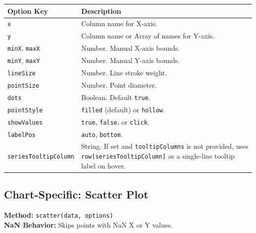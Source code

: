 \documentclass[10pt, a4paper]{article}
\begin{document}
\begin{longtable}{p{5cm} p{10cm}}
\toprule
\textbf{Option Key} & \textbf{Description} \\
\midrule
\texttt{x} & Column name for X-axis. \\
\texttt{y} & Column name or Array of names for Y-axis. \\
\texttt{minX}, \texttt{maxX} & Number. Manual X-axis bounds. \\
\texttt{minY}, \texttt{maxY} & Number. Manual Y-axis bounds. \\
\texttt{lineSize} & Number. Line stroke weight. \\
\texttt{pointSize} & Number. Point diameter. \\
\texttt{dots} & Boolean. Default \texttt{true}. \\
\texttt{pointStyle} & \texttt{filled} (default) or \texttt{hollow}. \\
\texttt{showValues} & \texttt{true}, \texttt{false}, or \texttt{click}. \\
\texttt{labelPos} & \texttt{auto}, \texttt{bottom}. \\
\texttt{seriesTooltipColumn} & String. If set and \texttt{tooltipColumns} is not provided, uses \texttt{row[seriesTooltipColumn]} as a single-line tooltip label on hover. \\
\bottomrule
\end{longtable}

\subsection{Chart-Specific: Scatter Plot}
\textbf{Method:} \texttt{scatter(data, options)} \\
\textbf{NaN Behavior:} Skips points with NaN X or Y values.
\end{document}
